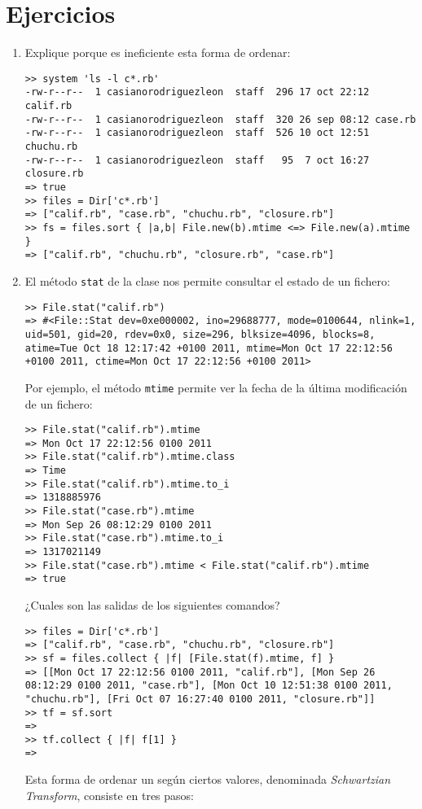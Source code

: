 \section{Ejercicios}
\label{ejercicios:schwartz}
\begin{enumerate}
\item Explique porque es ineficiente esta forma de ordenar:
\begin{verbatim}
>> system 'ls -l c*.rb'
-rw-r--r--  1 casianorodriguezleon  staff  296 17 oct 22:12 calif.rb
-rw-r--r--  1 casianorodriguezleon  staff  320 26 sep 08:12 case.rb
-rw-r--r--  1 casianorodriguezleon  staff  526 10 oct 12:51 chuchu.rb
-rw-r--r--  1 casianorodriguezleon  staff   95  7 oct 16:27 closure.rb
=> true
>> files = Dir['c*.rb']
=> ["calif.rb", "case.rb", "chuchu.rb", "closure.rb"]
>> fs = files.sort { |a,b| File.new(b).mtime <=> File.new(a).mtime }
=> ["calif.rb", "chuchu.rb", "closure.rb", "case.rb"]
\end{verbatim}
\item 
El método \verb|stat| de la clase  nos permite consultar el estado de un fichero:
\begin{verbatim}
>> File.stat("calif.rb")
=> #<File::Stat dev=0xe000002, ino=29688777, mode=0100644, nlink=1, uid=501, gid=20, rdev=0x0, size=296, blksize=4096, blocks=8, atime=Tue Oct 18 12:17:42 +0100 2011, mtime=Mon Oct 17 22:12:56 +0100 2011, ctime=Mon Oct 17 22:12:56 +0100 2011>
\end{verbatim}
Por ejemplo, el método \verb|mtime| permite ver la fecha de la última modificación de un fichero:
\begin{verbatim}
>> File.stat("calif.rb").mtime
=> Mon Oct 17 22:12:56 0100 2011
>> File.stat("calif.rb").mtime.class
=> Time
>> File.stat("calif.rb").mtime.to_i
=> 1318885976
>> File.stat("case.rb").mtime
=> Mon Sep 26 08:12:29 0100 2011
>> File.stat("case.rb").mtime.to_i
=> 1317021149
>> File.stat("case.rb").mtime < File.stat("calif.rb").mtime
=> true
\end{verbatim}
¿Cuales son las salidas de los siguientes comandos?
\begin{verbatim}
>> files = Dir['c*.rb']
=> ["calif.rb", "case.rb", "chuchu.rb", "closure.rb"]
>> sf = files.collect { |f| [File.stat(f).mtime, f] }
=> [[Mon Oct 17 22:12:56 0100 2011, "calif.rb"], [Mon Sep 26 08:12:29 0100 2011, "case.rb"], [Mon Oct 10 12:51:38 0100 2011, "chuchu.rb"], [Fri Oct 07 16:27:40 0100 2011, "closure.rb"]]
>> tf = sf.sort
=> 
>> tf.collect { |f| f[1] }
=> 
\end{verbatim}
Esta forma de ordenar un  según ciertos valores, denominada {\it Schwartzian Transform}, consiste en tres pasos:

\end{enumerate}
